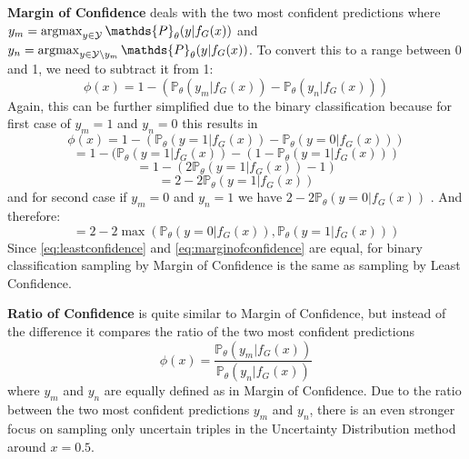 \textbf{Margin of Confidence}
deals with the two most confident predictions where
$y_m = \argmax_{y \in \mathcal{Y}} \mathds{P}_{\theta}(y | f_G(x))$ 
and $y_n = \argmax_{y \in \mathcal{Y} \setminus y_m}{\mathds{P}_{\theta}(y | f_G(x))}$.
To convert this to a range between 0 and 1, we need to subtract it from 1:
\begin{equation}
    \phi(x) = 1 - (\mathds{P}_{\theta}(y_m |f_G(x)) - \mathds{P}_{\theta}(y_n | f_G(x)))
\end{equation}
Again, this can be further simplified due to the binary classification because for first case of $y_m = 1$ and $y_n = 0$ this results in
\begin{equation}
    \phi(x) = 1 - (\mathds{P}_{\theta}(y = 1 |f_G(x)) - \mathds{P}_{\theta}(y = 0 | f_G(x)))
\end{equation}
\begin{equation}
    = 1 - (\mathds{P}_{\theta}(y = 1 |f_G(x)) 
    -  (1 - \mathds{P}_{\theta}(y = 1 | f_G(x)))
\end{equation}
\begin{equation}
    = 1 - (2 \mathds{P}_{\theta}(y = 1 |f_G(x)) - 1)
\end{equation}
\begin{equation}
    = 2 - 2 \mathds{P}_{\theta}(y = 1 |f_G(x))
\end{equation}
and for second case if $y_m = 0$ and $y_n = 1$ we have  $ 2 - 2 \mathds{P}_{\theta}(y = 0 |f_G(x))$ . 
And therefore:
\begin{equation} \label{eq:marginofconfidence}
    = 2 - 2 \max(\mathds{P}_{\theta}(y = 0 |f_G(x)), \mathds{P}_{\theta}(y = 1 |f_G(x)))
\end{equation}
Since \autoref{eq:leastconfidence} and \ref{eq:marginofconfidence} are equal, for binary classification sampling by Margin of Confidence is the same as sampling by Least Confidence.

\textbf{Ratio of Confidence}
is quite similar to Margin of Confidence, but instead of the difference it compares the ratio of the two most confident predictions
\begin{equation}
    \phi(x) = \frac{\mathds{P}_{\theta}(y_m | f_G(x))}{\mathds{P}_{\theta}(y_n | f_G(x))}
\end{equation}
where $y_m$ and $y_n$ are equally defined as in Margin of Confidence.
Due to the ratio between the two most confident predictions $y_m$ and $y_n$, there is an even stronger focus on sampling only uncertain triples in the Uncertainty Distribution method around $x = 0.5$.



